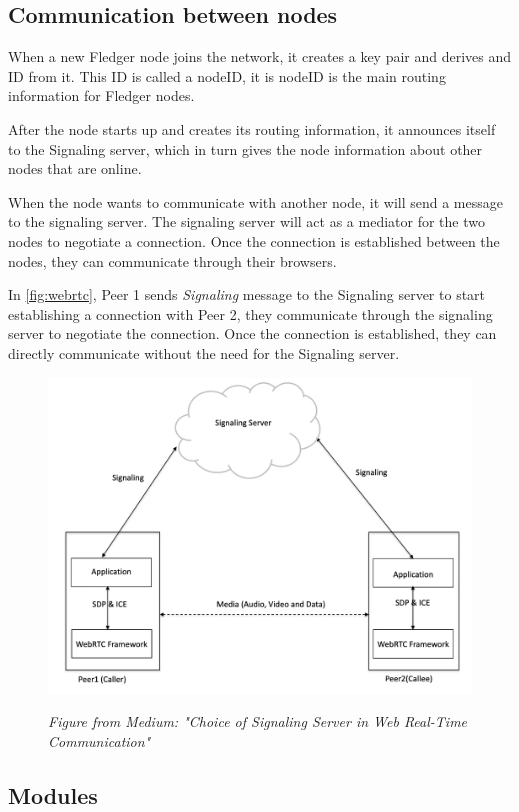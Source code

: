 \documentclass[a4paper,11pt,oneside]{report}
\begin{document}
\subsection{Communication between nodes}

When a new Fledger node joins the network, it creates a key pair and derives and ID from it. This ID is called a nodeID, it is nodeID is the main routing information for Fledger nodes. 

After the node starts up and creates its routing information, it announces itself to the Signaling server, which in turn gives the node information about other nodes that are online.

When the node wants to communicate with another node, it will send a message to the signaling server. The signaling server will act as a mediator for the two nodes to negotiate a connection. Once the connection is established between the nodes, they can communicate through their browsers.

In \autoref{fig:webrtc}, Peer 1 sends \textit{Signaling} message to the Signaling server to start establishing a connection with Peer 2, they communicate through the signaling server to negotiate the connection. Once the connection is established, they can directly communicate without the need for the Signaling server. 

\begin{figure}[H]
    \centering
    \includegraphics[width=0.8\linewidth]{plots/webrtc.png}
    \caption{}
    \label{fig:webrtc}
    \small\textit{Figure from Medium: "Choice of Signaling Server in Web Real-Time Communication"}
\end{figure}

\subsection{Modules}
\end{document}
